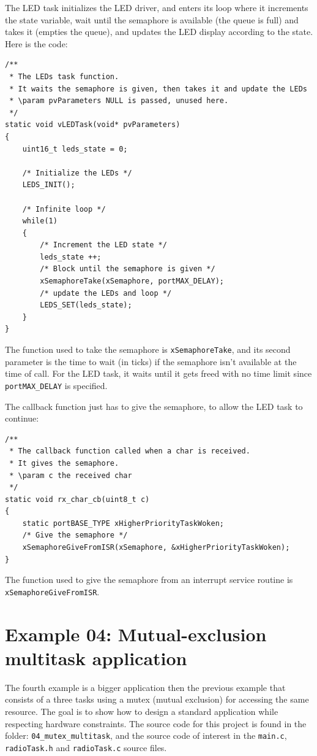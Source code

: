 \documentclass[11pt]{report}
\begin{document}
The LED task initializes the LED driver, and enters its loop where it increments the state variable, wait until the semaphore is available (the queue is full) and takes it (empties the queue), and updates the LED display according to the state. Here is the code:
\begin{verbatim}
/**
 * The LEDs task function.
 * It waits the semaphore is given, then takes it and update the LEDs
 * \param pvParameters NULL is passed, unused here.
 */
static void vLEDTask(void* pvParameters)
{
    uint16_t leds_state = 0;

    /* Initialize the LEDs */
    LEDS_INIT();

    /* Infinite loop */
    while(1)
    {
        /* Increment the LED state */
        leds_state ++;
        /* Block until the semaphore is given */
        xSemaphoreTake(xSemaphore, portMAX_DELAY);
        /* update the LEDs and loop */
        LEDS_SET(leds_state);
    }
}
\end{verbatim}

The function used to take the semaphore is \verb$xSemaphoreTake$, and its second parameter is the time to wait (in ticks) if the semaphore isn't available at the time of call. For the LED task, it waits until it gets freed with no time limit since \verb$portMAX_DELAY$ is specified.

The callback function just has to give the semaphore, to allow the LED task to continue:

\begin{verbatim}
/**
 * The callback function called when a char is received.
 * It gives the semaphore.
 * \param c the received char
 */
static void rx_char_cb(uint8_t c)
{
    static portBASE_TYPE xHigherPriorityTaskWoken;
    /* Give the semaphore */
    xSemaphoreGiveFromISR(xSemaphore, &xHigherPriorityTaskWoken);
}
\end{verbatim}

The function used to give the semaphore from an interrupt service routine is \verb$xSemaphoreGiveFromISR$.


\section{Example 04: Mutual-exclusion multitask application}

The fourth example is a bigger application then the previous example that consists of a three tasks using a mutex (mutual exclusion) for accessing the same resource. The goal is to show how to design a standard application while respecting hardware constraints. The source code for this project is found in the folder: \verb$04_mutex_multitask$, and the source code of interest in the \verb$main.c$, \verb$radioTask.h$ and \verb$radioTask.c$ source files.
\end{document}
